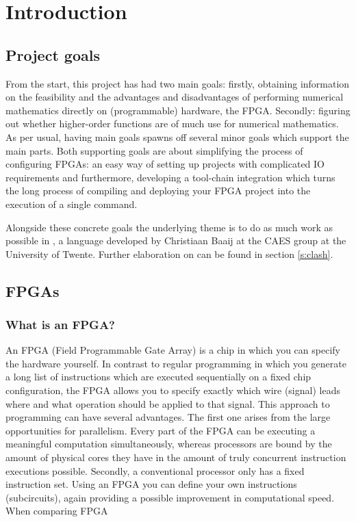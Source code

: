 \chapter{Introduction} 

\section{Project goals}
From the start, this project has had two main goals: firstly, obtaining information on the feasibility and the advantages and disadvantages of performing numerical mathematics directly on (programmable) hardware, the FPGA. Secondly: figuring out whether higher-order functions are of much use for numerical mathematics. As per usual, having main goals spawns off several minor goals which support the main parts. Both supporting goals are about simplifying the process of configuring FPGAs: an easy way of setting up projects with complicated IO requirements and furthermore, developing a tool-chain integration which turns the long process of compiling and deploying your FPGA project into the execution of a single command.

Alongside these concrete goals the underlying theme is to do as much work as possible in \clash{}, a language developed by Christiaan Baaij at the CAES group at the University of Twente. Further elaboration on \clash{} can be found in section \ref{s:clash}.


\section{FPGAs}
\subsection{What is an FPGA?}

An FPGA (Field Programmable Gate Array) is a chip in which you can specify the hardware yourself. In contrast to regular programming in which you generate a long list of instructions which are executed sequentially on a fixed chip configuration, the FPGA allows you to specify exactly which wire (signal) leads where and what operation should be applied to that signal. This approach to programming can have several advantages. The first one arises from the large opportunities for parallelism. Every part of the FPGA can be executing a meaningful computation simultaneously, whereas processors are bound by the amount of physical cores they have in the amount of truly concurrent instruction executions possible. Secondly, a conventional processor only has a fixed instruction set. Using an FPGA you can define your own instructions (subcircuits), again providing a possible improvement in computational speed. When comparing FPGA

